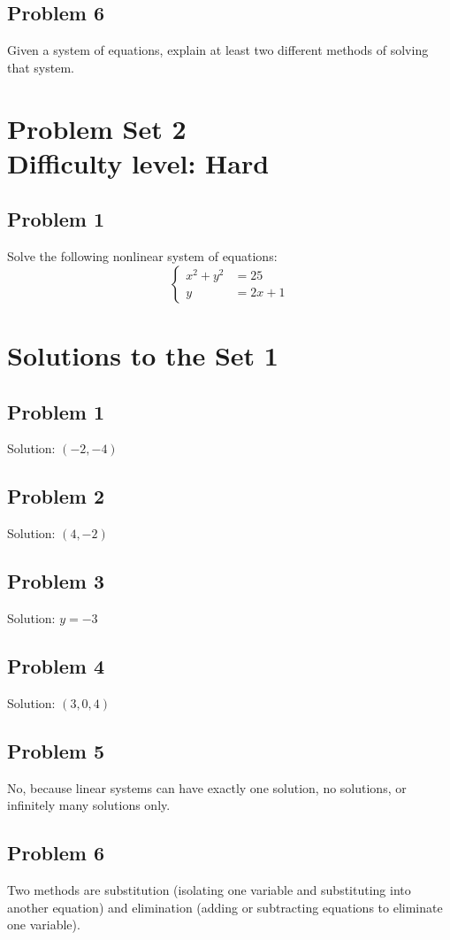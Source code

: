\documentclass[12pt]{article}
\begin{document}
\subsection*{Problem 6}
Given a system of equations, explain at least two different methods of solving that system.

\section*{Problem Set 2\\Difficulty level: Hard}
\subsection*{Problem 1}
Solve the following nonlinear system of equations:
\[
\left\{\begin{aligned}
x^2 + y^2 &= 25 \\[6pt]
y &= 2x + 1
\end{aligned}\right.
\]

\newpage
\section*{Solutions to the Set 1}
\subsection*{Problem 1}
Solution: \(\boxed{(-2,-4)}\)

\subsection*{Problem 2}
Solution: \(\boxed{(4,-2)}\)

\subsection*{Problem 3}
Solution: \(y=\boxed{-3}\)

\subsection*{Problem 4}
Solution: \(\boxed{(3,0,4)}\)

\subsection*{Problem 5}
No, because linear systems can have exactly one solution, no solutions, or infinitely many solutions only.

\subsection*{Problem 6}
Two methods are substitution (isolating one variable and substituting into another equation) and elimination (adding or subtracting equations to eliminate one variable).
\end{document}
